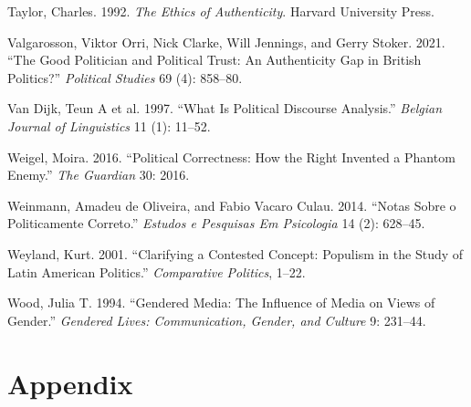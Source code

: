 \documentclass[
  12pt,
]{article}
\newlength{\cslhangindent}
\newlength{\cslentryspacingunit} %
\newenvironment{CSLReferences}[2] %
 {%
  \setlength{\parindent}{0pt}
  \ifodd #1
  \let\oldpar\par
  \def\par{\hangindent=\cslhangindent\oldpar}
  \fi
  \setlength{\parskip}{#2\cslentryspacingunit}
 }%
 {}
\begin{document}
\begin{CSLReferences}{1}{0}
\leavevmode{}%
Taylor, Charles. 1992. \emph{The Ethics of Authenticity}. Harvard
University Press.

\leavevmode{}%
Valgarosson, Viktor Orri, Nick Clarke, Will Jennings, and Gerry Stoker.
2021. {``The Good Politician and Political Trust: An Authenticity Gap in
British Politics?''} \emph{Political Studies} 69 (4): 858--80.

\leavevmode{}%
Van Dijk, Teun A et al. 1997. {``What Is Political Discourse
Analysis.''} \emph{Belgian Journal of Linguistics} 11 (1): 11--52.

\leavevmode{}%
Weigel, Moira. 2016. {``Political Correctness: How the Right Invented a
Phantom Enemy.''} \emph{The Guardian} 30: 2016.

\leavevmode{}%
Weinmann, Amadeu de Oliveira, and Fabio Vacaro Culau. 2014. {``Notas
Sobre o Politicamente Correto.''} \emph{Estudos e Pesquisas Em
Psicologia} 14 (2): 628--45.

\leavevmode{}%
Weyland, Kurt. 2001. {``Clarifying a Contested Concept: Populism in the
Study of Latin American Politics.''} \emph{Comparative Politics}, 1--22.

\leavevmode{}%
Wood, Julia T. 1994. {``Gendered Media: The Influence of Media on Views
of Gender.''} \emph{Gendered Lives: Communication, Gender, and Culture}
9: 231--44.

\end{CSLReferences}

\hypertarget{appendix}{%
\section{Appendix}\label{appendix}}
\end{document}
